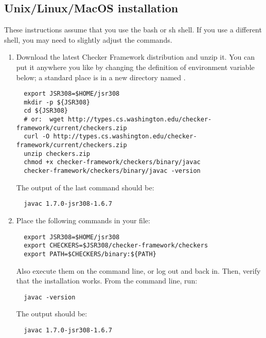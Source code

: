 \subsection{Unix/Linux/MacOS installation\label{unix-installation}}

These instructions assume that you use the bash or sh shell.  If you use a
different shell, you may need to slightly adjust the commands.

\begin{enumerate}

\item
  Download the latest Checker Framework distribution
  and unzip it.  You can put it anywhere you like by changing the
  definition of environment variable  below; a standard place
  is in a
  new directory named .

\begin{Verbatim}
  export JSR308=$HOME/jsr308
  mkdir -p ${JSR308}
  cd ${JSR308}
  # or:  wget http://types.cs.washington.edu/checker-framework/current/checkers.zip
  curl -O http://types.cs.washington.edu/checker-framework/current/checkers.zip
  unzip checkers.zip
  chmod +x checker-framework/checkers/binary/javac
  checker-framework/checkers/binary/javac -version
\end{Verbatim}

The output of the last command should be:

\begin{Verbatim}
  javac 1.7.0-jsr308-1.6.7
\end{Verbatim}


\item
  Place the following commands in your  file:
\begin{Verbatim}
  export JSR308=$HOME/jsr308
  export CHECKERS=$JSR308/checker-framework/checkers
  export PATH=$CHECKERS/binary:${PATH}
\end{Verbatim}


Also execute them on the command line, or log out and back in.  Then,
verify that the installation works.  From the command line, run:

\begin{Verbatim}
  javac -version
\end{Verbatim}

The output should be:

\begin{Verbatim}
  javac 1.7.0-jsr308-1.6.7
\end{Verbatim}

\end{enumerate}

